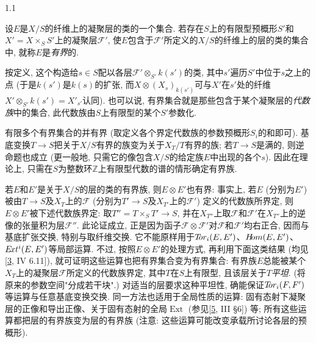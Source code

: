 \begin{definition}{1.1}\label{fga3.iv-1-definition-1.1}\skipsinglepar
\par{}设\(E\)是\(X/S\)的纤维上的凝聚层的类的一个集合. 若存在\(S\)上的有限型预概形\(S'\)和\(X'=X\times _S S'\)上的凝聚层\(\mathscr {F}'\), 使\(E\)包含于\(\mathscr {F}'\)所定义的\(X/S\)的纤维上的层的类的集合中, 就称\(E\)是\emph{有界}的.
\end{definition}
\par{}按定义, 这个构造给\(s\in  S\)配以各层\(\mathscr {F}'\otimes _{S'}k(s')\)的类, 其中\(s'\)遍历\(S'\)中位于\(s\)之上的点 (于是\(k(s')\)是\(k(s)\)的扩张, 而\(X\otimes  (X_s)_{k(s')}\)可与\(X'\)在\(s'\)处的纤维\(X'\otimes _{S'}k(s')=X'_{s'}\)认同). 也可以说, 有界集合就是那些包含于某个凝聚层的\emph{代数族}中的集合, 此代数族由\(S\)上有限型的某个\(S'\)参数化.
\par{}有限多个有界集合的并有界 (取定义各个界定代数族的参数预概形\(S_i\)的和即可). 基底变换\(T\to  S\)把关于\(X/S\)有界的族变为关于\(X_T/T\)有界的族; 若\(T\to  S\)是满的, 则逆命题也成立 (更一般地, 只需它的像包含\(X/S\)的给定族\(E\)中出现的各个\(s\)). 因此在理论上, 只需在\(S\)为整数环\(\mathbb {Z}\)上有限型代数的谱的情形确定有界族.
\par{}若\(E\)和\(E'\)是关于\(X/S\)的层的类的有界族, 则\(E\otimes  E'\)也有界: 事实上, 若\(E\) (分别为\(E'\)) 被由\(T\to  S\)及\(X_T\)上的\(\mathscr {F}\) (分别为\(T'\to  S\)及\(X_{T'}\)上的\(\mathscr {F}'\)) 定义的代数族所界定, 则\(E\otimes  E'\)被下述代数族界定: 取\(T''=T\times _S T'\to  S\), 并在\(X_{T''}\)上取\(\mathscr {F}\)和\(\mathscr {F}'\)在\(X_{T''}\)上的逆像的张量积为层\(\mathscr {F}''\). 此论证成立, 正是因为函子\(\mathscr {F}\otimes \mathscr {F}'\)对\(\mathscr {F}\)和\(\mathscr {F}'\)均右正合, 因而与基底扩张交换, 特别与取纤维交换. 它不能原样用于\(\mathscr {T}\kern  -2.75pt\mathit {or}_i(E,E')\)、\(\mathscr {H}\kern  -2.5pt\mathit {om}(E,E')\)、\(\mathscr {E}\kern  -1.5pt\mathit {xt}^i(E,E')\)等局部运算. 不过, 按照\(E\otimes  E'\)的处理方式, 再利用下面这类结果 (均见[\hyperref[Gro1960b]{3}, IV 6.11]), 就可证明这些运算也把有界集合变为有界集合: 有界族\(E\)总能被某个\(X_T\)上的凝聚层\(\mathscr {F}\)所定义的代数族界定, 其中\(T\)在\(S\)上有限型, 且该层关于\(T\)\emph{平坦}. (将原来的参数空间"分成若干块".) 对适当的层要求这种平坦性, 确能保证\(\mathscr {T}\kern  -2.75pt\mathit {or}_i(\mathscr {F},\mathscr {F}')\)等运算与任意基底变换交换. 同一方法也适用于全局性质的运算: 固有态射下凝聚层的正像和导出正像、关于固有态射的全局\(\operatorname {Ext}\) (参见[\hyperref[GD1960]{5}, III §6]) 等; 所有这些运算都把层的有界族变为层的有界族 (注意: 这些运算可能改变承载所讨论各层的预概形).
